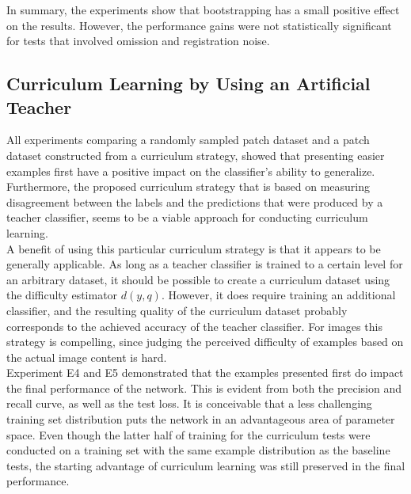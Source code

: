 In summary, the experiments show that bootstrapping has a small positive effect on the results. However, the performance gains were not statistically significant for tests that involved omission and registration noise.\\


\subsection{Curriculum Learning by Using an Artificial Teacher}

All experiments comparing a randomly sampled patch dataset and a patch dataset constructed from a curriculum strategy, showed that presenting easier examples first have a positive impact on the classifier's ability to generalize. Furthermore, the proposed curriculum strategy that is based on measuring disagreement between the labels and the predictions that were produced by a teacher classifier, seems to be a viable approach for conducting curriculum learning.\\

A benefit of using this particular curriculum strategy is that it appears to be generally applicable. As long as a teacher classifier is trained to a certain level for an arbitrary dataset, it should be possible to create a curriculum dataset using the difficulty estimator $d(y,q)$. However, it does require training an additional classifier, and the resulting quality of the curriculum dataset probably corresponds to the achieved accuracy of the teacher classifier. For images this strategy is compelling, since judging the perceived difficulty of examples based on the actual image content is hard.\\

Experiment E4 and E5 demonstrated that the examples presented first do impact the final performance of the network. This is evident from both the precision and recall curve, as well as the test loss. It is conceivable that a less challenging training set distribution puts the network in an advantageous area of parameter space. Even though the latter half of training for the curriculum tests were conducted on a training set with the same example distribution as the baseline tests, the starting advantage of curriculum learning was still preserved in the final performance.  \\

